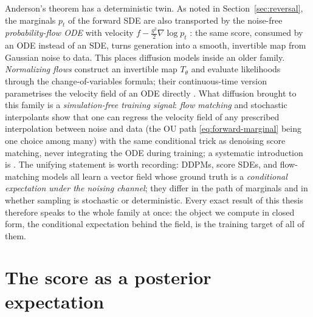 Anderson's theorem has a deterministic twin. As noted in
Section~\ref{sec:reversal}, the marginals $p_t$ of the forward SDE are
also transported by the noise-free \emph{probability-flow ODE} with
velocity $f - \tfrac{g^2}{2}\nabla \log p_t$ \citep{song2021scorebased}:
the same score, consumed by an ODE instead of an SDE, turns generation
into a smooth, invertible map from Gaussian noise to data. This places
diffusion models inside an older family. \emph{Normalizing flows}
\citep{rezende2015variational, papamakarios2021normalizing} construct an
invertible map $T_\theta$ and evaluate likelihoods through the
change-of-variables formula; their continuous-time version parametrises
the velocity field of an ODE directly \citep{chen2018neural}. What
diffusion brought to this family is a \emph{simulation-free training
signal}: \emph{flow matching} \citep{lipman2023flow} and stochastic
interpolants \citep{albergo2023building} show that one can regress the
velocity field of any prescribed interpolation between noise and data
(the OU path \eqref{eq:forward-marginal} being one choice among many)
with the same conditional trick as denoising score matching, never
integrating the ODE during training; a systematic introduction is
\citet{holderrieth2025flow}. The unifying statement is worth recording:
DDPMs, score SDEs, and flow-matching models all learn a vector field
whose ground truth is a \emph{conditional expectation under the noising
channel}; they differ in the path of marginals and in whether sampling is
stochastic or deterministic. Every exact result of this thesis therefore
speaks to the whole family at once: the object we compute in closed form,
the conditional expectation behind the field, is the training target of
all of them.

\section{The score as a posterior expectation}\label{sec:tweedie}

